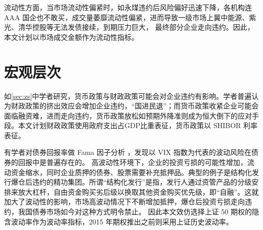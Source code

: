 流动性方面，当市场流动性偏紧时，如永煤违约后风险偏好迅速下降，各机构连 AAA 国企也不敢买，成交量萎靡流动性偏紧，进而导致一级市场上冀中能源、紫光、清华控股等无法发债接续，到期压力巨大， 最终部分企业走向违约。因此，本文计划以市场成交金额作为流动性指标。

\section{宏观层次}
如\ref{sec:zs}中学者研究，货币政策与财政政策可能会对企业违约有影响。学者普遍认为财政政策的挤出效应会增加企业违约，“国进民退”；而货币政策收紧企业可能会面临融资难，进而走向违约，货币政策放松如预期外降准则成为恒大倒下的应对手段。本文计划财政政策使用政府支出占GDP比重表征，货币政策以 SHIBOR 利率表征。

有学者对债券回报率做 Fama 因子分析
\cite{chung2019volatility}
，发现以 VIX 指数为代表的波动风险在债券的回报中是普遍存在的。
高波动性环境下，企业的投资亏损的可能性增加，流动资金缩水，同时企业质押的债券、股票需要补充抵押品。典型的例子是结构化发行爆仓后违约的精功集团。所谓“结构化发行”是指，发行人通过资管产品的分级安排来放大杠杆，自由资金购买劣后级以换取其他资金购买优先级，即“自融”。这就加大了波动性的影响，市场高波动情况下不断增加抵押，爆仓后投资亏损走向违约，我国债券市场如今对这种方式明令禁止。
因此本文效仿选择上证 50 期权的隐含波动率作为波动率指标，2015 年期权推出之前则采用上证历史波动率。
